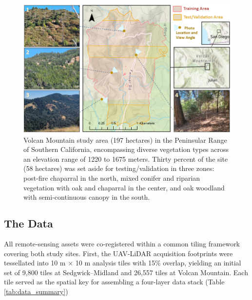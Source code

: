 \documentclass[remotesensing,article,submit,pdftex,moreauthors]{Definitions/mdpi}
\begin{document}
\begin{figure}[!t]
    \centering
    \includegraphics[width=1\linewidth]{manuscript/figures/Volcan_Mtn_Study_Area.png}
    \caption{Volcan Mountain study area (197 hectares) in the Peninsular Range of Southern California, encompassing diverse vegetation types across an elevation range of 1220 to 1675 meters. Thirty percent of the site (58 hectares) was set aside for testing/validation in three zones: post-fire chaparral in the north, mixed conifer and riparian vegetation with oak and chaparral in the center, and oak woodland with semi-continuous canopy in the south. }
    \label{fig:volcan_mtn_study_area}
\end{figure}






\subsection{The Data}

All remote‐sensing assets were co-registered within a common tiling framework covering both study sites.  
First, the UAV‐LiDAR acquisition footprints were tessellated into 10 m × 10 m analysis tiles with 15\% overlap, yielding an initial set of 9,800 tiles at Sedgwick–Midland and 26,557 tiles at Volcan Mountain.  Each tile served as the spatial key for assembling a four-layer data stack (Table \ref{tab:data_summary})

\end{document}
